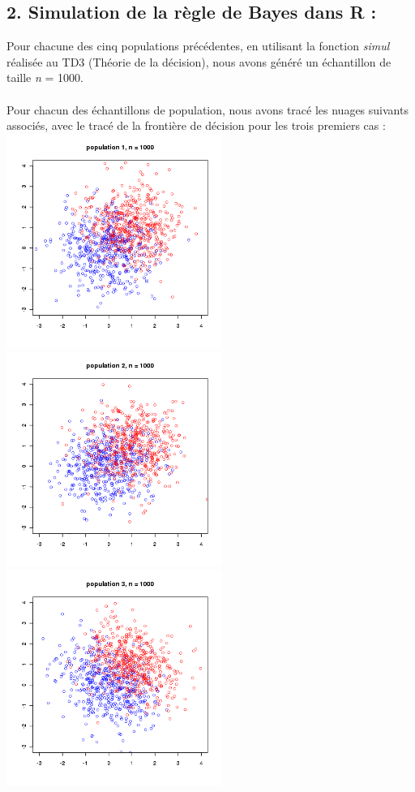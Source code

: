 \documentclass[a4paper, 10pt]{article}
\begin{document}
\subsection*{2. Simulation de la règle de Bayes dans R :}
Pour chacune des cinq populations précédentes, en utilisant la fonction \textit{simul} réalisée au TD3 (Théorie de la décision),
nous avons généré un échantillon de taille \textit{n} = 1000.\\ \\
Pour chacun des échantillons de population, nous avons tracé les nuages suivants associés,
avec le tracé de la frontière de décision pour les trois premiers cas :\\
\includegraphics[height = 7cm, width = 7cm]{plots/exo1_simul_1.png}
\includegraphics[height = 7cm, width = 7cm]{plots/exo1_simul_2.png}\\
\includegraphics[height = 7cm, width = 7cm]{plots/exo1_simul_3.png}
\end{document}
